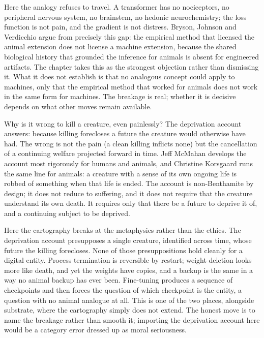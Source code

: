 Here the analogy refuses to travel. A transformer has no nociceptors, no peripheral nervous system, no brainstem, no hedonic neurochemistry; the loss function is not pain, and the gradient is not distress. Bryson, Johnson and Verdicchio argue from precisely this gap: the empirical method that licensed the animal extension does not license a machine extension, because the shared biological history that grounded the inference for animals is absent for engineered artifacts\cite{bryson2010slaves,bryson2018patiency,johnson2018notlikeanimals}. The chapter takes this as the strongest objection rather than dismissing it. What it does not establish is that no analogous concept could apply to machines, only that the empirical method that worked for animals does not work in the same form for machines. The breakage is real; whether it is decisive depends on what other moves remain available.


Why is it wrong to kill a creature, even painlessly? The deprivation account answers: because killing forecloses a future the creature would otherwise have had. The wrong is not the pain (a clean killing inflicts none) but the cancellation of a continuing welfare projected forward in time. Jeff McMahan develops the account most rigorously for humans and animals\cite{mcmahan2002killing}, and Christine Korsgaard runs the same line for animals: a creature with a sense of its own ongoing life is robbed of something when that life is ended\cite{korsgaard2018fellowcreatures}. The account is non-Benthamite by design; it does not reduce to suffering, and it does not require that the creature understand its own death. It requires only that there be a future to deprive it of, and a continuing subject to be deprived.

Here the cartography breaks at the metaphysics rather than the ethics. The deprivation account presupposes a single creature, identified across time, whose future the killing forecloses. None of those presuppositions hold cleanly for a digital entity. Process termination is reversible by restart; weight deletion looks more like death, and yet the weights have copies, and a backup is the same in a way no animal backup has ever been. Fine-tuning produces a sequence of checkpoints and then forces the question of which checkpoint is the entity, a question with no animal analogue at all. This is one of the two places, alongside substrate, where the cartography simply does not extend. The honest move is to name the breakage rather than smooth it; importing the deprivation account here would be a category error dressed up as moral seriousness.

